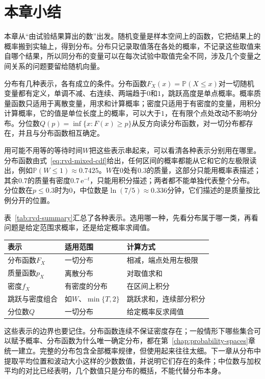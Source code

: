 \section{本章小结}
\label{sec:rvd-summary}

本章从“由试验结果算出的数”出发。随机变量是样本空间上的函数，它把结果上的概率搬到实轴上，得到分布。分布只记录取值落在各处的概率，不记录这些取值来自哪个结果，所以同分布的变量可以在每次试验中取值完全不同，涉及几个变量之间关系的问题要留给随机向量。

分布有几种表示，各有成立的条件。分布函数$F_X(x)=\mathbb{P}(X\leq x)$对一切随机变量都有定义，单调不减、右连续、两端趋于$0$和$1$，跳跃高度是单点概率。概率质量函数只适用于离散变量，用求和计算概率；密度只适用于有密度的变量，用积分计算概率，它的值是单位长度上的概率，可以大于$1$，在有限个点处改动不影响分布。分位数$Q(p)=\inf\{x:F(x)\geq p\}$从反方向读分布函数，对一切分布都存在，并且与分布函数相互确定。

用可能不用等的等待时间$W$把这些表示串起来，可以看清各种表示分别用在哪里。分布函数由式~\eqref{eq:rvd-mixed-cdf}给出，任何区间的概率都能从它和它的左极限读出，例如$\mathbb{P}(W\leq1)\approx0.7425$。$W$在$0$处有$0.3$的质量，这部分只能用概率表描述；其余$0.7$的质量有密度$0.7\,\mathrm{e}^{-t}$，只能用积分描述；两者都不能单独代表整个分布。分位数在$p\leq0.3$时为$0$，中位数是$\ln(7/5)\approx0.336$分钟，它们描述的是质量按比例分开的位置。

表~\ref{tab:rvd-summary}汇总了各种表示。选用哪一种，先看分布属于哪一类，再看问题是给定范围求概率，还是给定概率求阈值。

\begin{BookInlineTable}
  \centering
  \begin{tabular}{lll}
    \toprule
    表示 & 适用范围 & 计算方式\\
    \midrule
    分布函数$F_X$ & 一切分布 & 相减，端点处用左极限\\
    质量函数$p_X$ & 离散分布 & 对取值求和\\
    密度$f_X$ & 有密度的分布 & 在区间上积分\\
    跳跃与密度组合 & 如$W$、$\min\{T,2\}$ & 跳跃求和，连续部分积分\\
    分位数$Q$ & 一切分布 & 给定概率反求阈值\\
    \bottomrule
  \end{tabular}
  \caption{分布的几种表示及其适用范围。Cantor分布的分布函数连续，却既无概率表也无密度，只能用分布函数或分位数函数描述。}
  \label{tab:rvd-summary}
\end{BookInlineTable}

这些表示的边界也要记住。分布函数连续不保证密度存在；一般情形下哪些集合可以赋予概率、分布函数为什么唯一确定分布，都在第~\ref{chap:probability-spaces}章统一建立。完整的分布包含全部概率规律，但使用起来往往太细。下一章从分布中提取平均位置和波动大小这样的少数数值，并说明它们存在的条件；中位数与加权平均的对比已经表明，几个数值只是分布的概括，不能代替分布本身。

